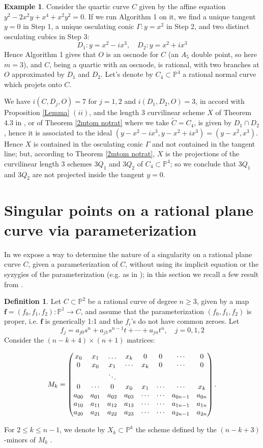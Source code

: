 \documentclass[draft]{amsart}
\theoremstyle{definition}
\newtheorem{defn}[thm]{Definition}
\theoremstyle{remark}
\theoremstyle{definition}
\newtheorem{ex}[thm]{Example}
\newcommand{\PP}{\mathbb{P}}
\def\b{\par \noindent}
\def\dd{\medskip \par \noindent}
\begin{document}
\begin{ex}\label{controes}
Consider the quartic curve $C $ given by the affine equation $y^2-2x^2y+x^4+x^2y^2=0$. If we run Algorithm 1 on it, we find a unique tangent $y=0$ in Step 1, a unique osculating conic $\Gamma: y=x^2$ in Step 2, and two distinct osculating cubics in Step 3: 
$$D_1: y=x^2-ix^3,\quad D_2: y=x^2+ix^3$$
Hence Algorithm 1 gives that $O$  is an oscnode for $C$ (an $A_5$ double point, so here $m=3$), and $C$, being a quartic with an oscnode, is rational, with two branches at $O$  approximated by $D_1$ and $D_2$. Let's denote by $C_4\subset \PP ^4$ a rational normal curve which projets onto $C$.

We have $i(C,D_j,O)=7$ for $j=1,2$ and $i(D_1,D_2,O)=3$, in accord with Proposition \ref{Lemma} $(ii)$, and the length 3 curvilinear scheme $X$ of Theorem 4.3 in \cite{BGI}, or of Theorem \ref{2mtom notrat} where we take $\tilde C=C_4$, is given by $D_1\cap D_2$, hence it is associated to the ideal $(y-x^2-ix^3,y-x^2+ix^3)=(y-x^2,x^3)$.
Hence $X$  is contained in the osculating conic $\Gamma$ and not contained in the tangent line; but, according to Theorem \ref{2mtom notrat}, $X$ is the projections of the curvilinear length 3 schemes $3Q_1$ and $3Q_2$ of  $C_4\subset \PP ^4$; so we conclude that $3Q_1$ and $3Q_2$ are not projected inside the tangent $y=0$.

\end{ex}


\section{Singular points on a rational plane curve via parameterization}\label{Xk}

\b In \cite{BGI} we expose a way to determine the nature of a singularity on a rational plane curve $C$, given a parameterization of $C$,  without using its implicit equation or the syzygies of the parameterization (e.g. as in \cite{CKPU}); in this section we recall a few result from \cite{BGI}.

\begin{defn}\label{defXk} Let $C\subset \mathbb{P}^2$ be a rational curve of degree $n\geq 3$, given by a map  ${\mathbf{f}}= (f_0,f_1,f_2): \PP ^1 \to C$, and assume that the parameterization $(f_0, f_1, f_2)$ is proper, i.e. ${\mathbf{f}}$ is generically 1:1 and the $f_i$'s do not have common zeroes. Let $$f_j = a_{j0}s^n + a_{j1}s^{n-1}t + \cdots + a_{jn}t^n, \quad j=0,1,2$$
Consider the $(n-k+4)\times (n+1)$ matrices:

$$
M_k=  \begin{pmatrix} x_0&x_1&\ldots &x_k&0&0&\cdots &0 \cr
0&x_0&x_1&\cdots &x_k&0&\cdots&0
\cr  & &\ddots&&  & & &  \cr
0&\cdots&0&x_0&x_1&\cdots &\cdots &x_k\cr
 a_{00}& a_{01}& a_{02}& a_{03}& \cdots& \cdots & a_{0n-1} &a_{0n}\cr
a_{10}& a_{11}& a_{12}& a_{13}& \cdots & \cdots & a_{1n-1} &a_{1n}\cr a_{20}& a_{21}& a_{22}& a_{23}& \cdots & \cdots& a_{2n-1} &a_{2n}
\end{pmatrix}.
$$
\dd For $2\leq k \leq n-1$, we denote by  $X_k\subset \PP^k$  the scheme defined by the $(n-k+3)$-minors of $M_k$ .
\end{defn}
\end{document}
